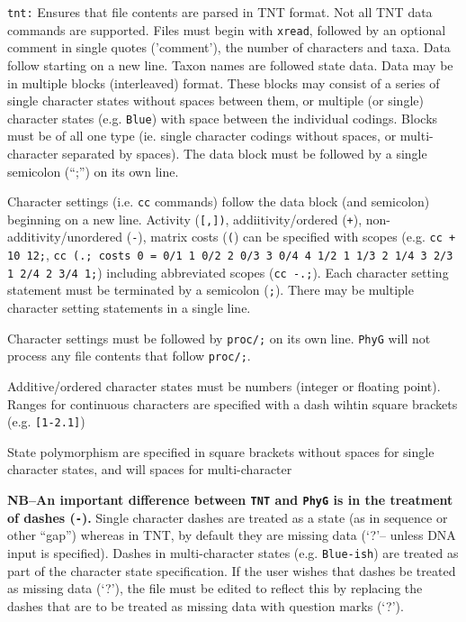 \documentclass[11pt]{article}
\begin{document}
			\smallskip		
			\noindent \texttt{tnt:} Ensures that file contents are parsed in TNT \citep{Goloboffetal2008} format.
			Not all TNT data commands are supported.  Files must begin with \texttt{xread}, followed by an optional comment in single quotes ('comment'), the number of characters and taxa.  Data follow starting on a new
			line.  Taxon names are followed state data.  Data may be in multiple blocks (interleaved) format.  These
			blocks may consist of a series of single character states  without spaces between them, or multiple (or single) character states (e.g. \texttt{Blue}) with space between the individual codings. Blocks must be of all
			one type (ie. single character codings without spaces, or multi-character separated by spaces).
			The data block must be followed by a single semicolon (``;'') on its own line.
			
			Character settings (i.e. \texttt{cc} commands) follow the data block (and semicolon)
		    beginning on a new line.  Activity (\texttt{[,])}, addiitivity/ordered (\texttt{+}), non-additivity/unordered
		    (\texttt{-}), matrix costs (\texttt{(}) can be specified with scopes (e.g. \texttt{cc + 10 12;}, \texttt{cc (.;
		    costs 0 = 0/1 1 0/2 2 0/3 3 0/4 4 1/2 1 1/3 2 1/4 3 2/3 1 2/4 2 3/4 1;}) including abbreviated scopes (\texttt{cc -.;}). Each character setting statement must be terminated by a semicolon (\texttt{;}).  There may
	        be multiple character setting statements in a single line. 
		    
		    Character settings must be followed by \texttt{proc/;} on its own line. \texttt{PhyG} will not process
		    any file contents that follow  \texttt{proc/;}.
		    
		    Additive/ordered character states must be numbers (integer or floating point).  Ranges for continuous
		    characters are specified with a dash wihtin square brackets (e.g. \texttt{[1-2.1]})
		    
		    State polymorphism are specified in square brackets without spaces for
		    single character states, and will spaces for multi-character
		    
		    \textbf{NB--An important difference between \texttt{TNT} and \texttt{PhyG} is in the 
		    treatment of dashes (\texttt{-}).}  Single character dashes are treated as a state (as in sequence or other 
		    ``gap'') whereas in TNT, by default they are missing data (`?'-- unless DNA input is specified).  Dashes in multi-character states (e.g. \texttt{Blue-ish}) are treated as part of the character state specification.
		    If the user wishes that dashes be treated as missing data (`?'), the file must be edited to reflect this
		    by replacing the dashes that are to be treated as missing data with question marks (`?').
		    
\end{document}
